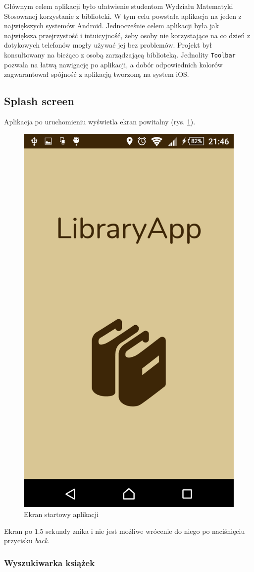 \documentclass[twoside]{projektInzynierskiMS}
\begin{document}
Głównym celem aplikacji było ułatwienie studentom Wydziału Matematyki Stosowanej korzystanie z biblioteki. W tym celu powstała aplikacja na jeden z największych systemów Android. Jednocześnie celem aplikacji była jak największa przejrzystość i intuicyjność, żeby osoby nie korzystające na co dzień z dotykowych telefonów mogły używać jej bez problemów. Projekt był konsultowany na bieżąco z osobą zarządzającą biblioteką. Jednolity \verb`Toolbar` pozwala na łatwą nawigację po aplikacji, a dobór odpowiednich kolorów zagwarantował spójność z aplikacją tworzoną na system iOS.
 
\subsection{Splash screen}

Aplikacja po uruchomieniu wyświetla ekran powitalny (rys. \ref{fig:splashScreen}). 

\begin{figure}[h]
  \centering
  \includegraphics[width=0.4\linewidth]{img/android/android1.png}
  \caption{Ekran startowy aplikacji}
  \label{fig:splashScreen}
\end{figure}

Ekran po $1.5$ sekundy znika i nie jest możliwe wrócenie do niego po naciśnięciu przycisku \textit{back}.

\subsubsection{Wyszukiwarka książek}
\end{document}
